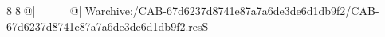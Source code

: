 8  8  @|                                                   @| W   archive:/CAB-67d6237d8741e87a7a6de3de6d1db9f2/CAB-67d6237d8741e87a7a6de3de6d1db9f2.resS 